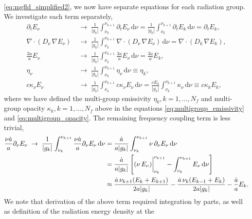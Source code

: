 \documentclass[10pt]{article}
\renewcommand{\(}{\left(}
\renewcommand{\)}{\right)}
\newcommand{\adot}{\dot{a}}
\newcommand{\Enu}{E_{\nu}}
\begin{document}
\eqref{eq:mgfld_simplified2}, we now have separate equations for each
radiation group. We investigate each term separately,
\begin{align}
 \label{eq:multigroup_timederivative}
   \partial_{t} \Enu &\;\rightarrow\;
   \frac{1}{|g_k|} \int_{\nu_k}^{\nu_{k+1}} \partial_{t} \Enu\,\mathrm d\nu
   =
   \frac{1}{|g_k|} \int_{\nu_k}^{\nu_{k+1}} \partial_{t} E_k\,\mathrm d\nu
   =
   \partial_{t} E_k, \\
 \label{eq:multigroup_diffusion}
   \nabla\cdot(D_{\nu}\,\nabla\Enu) &\;\rightarrow\;
   \frac{1}{|g_k|} \int_{\nu_k}^{\nu_{k+1}} \nabla\cdot(D_{\nu}\,\nabla\Enu)\,\mathrm d\nu
   =
   \nabla\cdot(D_k\,\nabla E_k), \\
 \label{eq:multigroup_depletion}
   \frac{3 \adot}{a} \Enu &\;\rightarrow\;
   \frac{1}{|g_k|} \int_{\nu_k}^{\nu_{k+1}} \frac{3 \adot}{a} \Enu\,\mathrm d\nu
   =
   \frac{3 \adot}{a} E_k, \\
 \label{eq:multigroup_emissivity}
   \eta_{\nu} &\;\rightarrow\;
   \frac{1}{|g_k|} \int_{\nu_k}^{\nu_{k+1}} \eta_{\nu}\,\mathrm d\nu
   \equiv
   \eta_k, \\
 \label{eq:multigroup_opacity}
   c \kappa_{\nu} \Enu &\;\rightarrow\;
   \frac{1}{|g_k|} \int_{\nu_k}^{\nu_{k+1}} c \kappa_{\nu} \Enu\,\mathrm d\nu
   =
   \frac{c E_k}{|g_k|} \int_{\nu_k}^{\nu_{k+1}} \kappa_{\nu}\,\mathrm d\nu
   \equiv
   c \kappa_k E_k,
\end{align}
where we have defined the multi-group emissivity $\eta_k, k=1,\ldots,N_f$ and
multi-group opacity $\kappa_k, k=1,\ldots,N_f$ above in the equations
\eqref{eq:multigroup_emissivity} and \eqref{eq:multigroup_opacity}.
The remaining frequency coupling term is less trivial,
\begin{align}
\notag
   \frac{\nu \adot}{a}\partial_{\nu}\Enu \;\rightarrow\;
   \frac{1}{|g_k|} \int_{\nu_k}^{\nu_{k+1}} \frac{\nu \adot}{a}\partial_{\nu}\Enu\,\mathrm d\nu
   &=
   \frac{\adot}{a|g_k|} \int_{\nu_k}^{\nu_{k+1}} \nu\,\partial_{\nu}\Enu\,\mathrm d\nu \\
\label{eq:multigroup_redshifting}
   &=
   \frac{\adot}{a|g_k|}
   \left[(\nu\,\Enu)\bigg\vert_{\nu_k}^{\nu_{k+1}} - \int_{\nu_k}^{\nu_{k+1}} \Enu\,\mathrm d\nu\right]\\
\notag
   &\approx
   \frac{\adot\, \nu_{k+1} (E_k+E_{k+1})}{2a|g_k|} -
   \frac{\adot\, \nu_{k} (E_{k-1}+E_{k})}{2a|g_k|} - \frac{\adot}{a}E_k.
\end{align}
We note that derivation of the above term required integration by
parts, as well as definition of the radiation energy density at the
\end{document}
